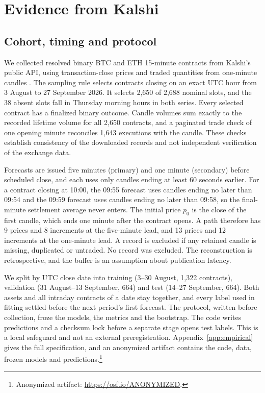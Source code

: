 \documentclass[runningheads]{llncs}
\begin{document}
\section{Evidence from Kalshi}
\label{sec:empirical}
\subsection{Cohort, timing and protocol}
We collected resolved binary BTC and ETH 15-minute contracts from Kalshi's public API, using transaction-close prices and traded quantities from one-minute candles \cite{kalshi2026candles,kalshi2026markets}. The sampling rule selects contracts closing on an exact UTC hour from 3 August to 27 September 2026. It selects 2,650 of 2,688 nominal slots, and the 38 absent slots fall in Thursday morning hours in both series. Every selected contract has a finalized binary outcome. Candle volumes sum exactly to the recorded lifetime volume for all 2,650 contracts, and a paginated trade check of one opening minute reconciles 1,643 executions with the candle. These checks establish consistency of the downloaded records and not independent verification of the exchange data.

Forecasts are issued five minutes (primary) and one minute (secondary) before scheduled close, and each uses only candles ending at least 60 seconds earlier. For a contract closing at 10:00, the 09:55 forecast uses candles ending no later than 09:54 and the 09:59 forecast uses candles ending no later than 09:58, so the final-minute settlement average never enters. The initial price $p_0$ is the close of the first candle, which ends one minute after the contract opens. A path therefore has 9 prices and 8 increments at the five-minute lead, and 13 prices and 12 increments at the one-minute lead. A record is excluded if any retained candle is missing, duplicated or untraded. No record was excluded. The reconstruction is retrospective, and the buffer is an assumption about publication latency.

We split by UTC close date into training (3--30 August, 1,322 contracts), validation (31 August--13 September, 664) and test (14--27 September, 664). Both assets and all intraday contracts of a date stay together, and every label used in fitting settled before the next period's first forecast. The protocol, written before collection, froze the models, the metrics and the bootstrap. The code writes predictions and a checksum lock before a separate stage opens test labels. This is a local safeguard and not an external preregistration. Appendix~\ref{app:empirical} gives the full specification, and an anonymized artifact contains the code, data, frozen models and predictions.\footnote{Anonymized artifact: \url{https://osf.io/ANONYMIZED}.}
\end{document}
